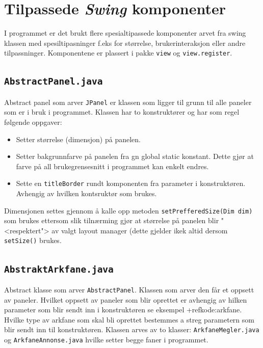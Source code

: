 \section[Swing komponenter]{Tilpassede \emph{Swing} komponenter} \label{sec:swing}
I programmet er det brukt flere spesialtipassede komponenter arvet fra swing klassen med spesiltipasninger f.eks for størrelse, brukerinteraksjon eller andre tilpassninger. Komponentene er plassert i pakke \texttt{view} og \texttt{view.register}.

\subsection{\texttt{AbstractPanel.java}}
Abstract panel som arver \texttt{JPanel} er klassen som ligger til grunn til alle paneler som er i bruk i programmet. Klassen har to konstruktører og har som regel følgende oppgaver:
\begin{itemize}
\item Setter størrelse (dimensjon) på panelen.
\item Setter bakgrunnfarve på panelen fra gn global static konstant. Dette gjør at farve på all brukegrensesnitt i programmet kan enkelt endres.
\item Sette en \texttt{titleBorder} rundt komponenten fra parameter i konstruktøren. Avhengig av hvilken kontsruktør som brukes.
\end{itemize}
Dimensjonen settes gjennom å kalle opp metoden \texttt{setPrefferedSize(Dim dim)} som brukes ettersom slik tilnærming gjør at størrelse på panelen blir "<respektert"> av valgt layout manager (dette gjelder ikek altid dersom \texttt{setSize()} brukes.





\subsection{\texttt{AbstraktArkfane.java}}
Abstract klasse som arver \texttt{AbstractPanel}. Klassen som arver den får et oppsett av paneler. Hvilket oppsett av paneler som blir oprettet er avhengig av hilken parameter som blir sendt inn i konstruktøren se eksempel +ref{kode:arkfane}. Hvilke type av arkfane som skal bli oprettet bestemmes a streg parametern som blir sendt inn til konstruktøren. Klassen arves av to klasser: \texttt{ArkfaneMegler.java} og \texttt{ArkfaneAnnonse.java} hvilke setter begge faner i programmet. 

